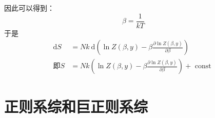 \documentclass[12pt, a4paper, oneside]{ctexbook}
\newcommand{\hl}[1]{\hlbox{#1}}
\newcounter{#2}
\newcounter{#2}[#1]
\numberwithin{#2}{#1}
\begin{document}
          \begin{deduce}
            因此可以得到\hl{温度}：
            \begin{equation}
              \beta=\frac{1}{kT}
            \end{equation}
            于是\hl{熵}
            \begin{equation}
              \begin{aligned}
                \mathrm{d} S & =N k \mathrm{~d}\left(\ln Z(\beta, y)-\beta \frac{\partial \ln Z(\beta, y)}{\partial \beta}\right) \\
                \text{即}S & =N k\left(\ln Z(\beta, y)-\beta \frac{\partial \ln Z(\beta, y)}{\partial \beta}\right)+\text { const }
                \end{aligned}
            \end{equation}
          \end{deduce}

          \chapter{正则系综和巨正则系综}
\end{document}
